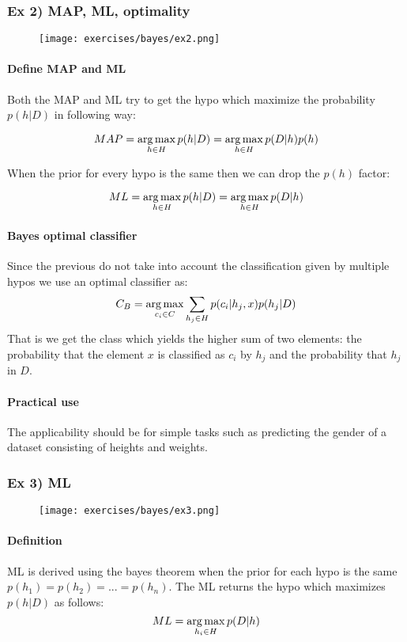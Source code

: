 \subsubsection{Ex 2) MAP, ML, optimality}
\begin{figure}[H]
    \centering
   \texttt{[image: exercises/bayes/ex2.png]}
\end{figure}

\paragraph{Define MAP and ML }
Both the MAP and ML try to get the hypo which maximize the probability $p(h|D)$ in following way:

$$MAP=\operatorname*{arg\,max}_{h \in H} p(h|D)=\operatorname*{arg\,max}_{h \in H} p(D|h)p(h)$$

When the prior for every hypo is the same then we can drop the $p(h)$ factor:

$$ML=\operatorname*{arg\,max}_{h \in H} p(h|D)=\operatorname*{arg\,max}_{h \in H} p(D|h)$$

\paragraph{Bayes optimal classifier}
Since the previous do not take into account the classification given by multiple hypos we use an optimal classifier as:
$$C_{B}=\operatorname*{arg\,max}_{c_i \in C}\sum_{h_j \in H} p(c_i| h_j,x)p(h_j|D)$$
That is we get the class which yields the higher sum of two elements: the probability that the element $x$ is classified as $c_i$ by $h_j$ and the probability that $h_j$ in $D$.

\paragraph{Practical use}
The applicability should be for simple tasks such as predicting the gender of a dataset consisting of heights and weights.


\subsubsection{Ex 3) ML}
\begin{figure}[H]
    \centering
   \texttt{[image: exercises/bayes/ex3.png]}
\end{figure}

\paragraph{Definition}
ML is derived using the bayes theorem when the prior for each hypo is the same $p(h_1)=p(h_2)=...=p(h_n)$.
The ML returns the hypo which maximizes $p(h|D)$ as follows:
$$ML=\operatorname*{arg\,max}_{h_i \in H}p(D|h)$$

